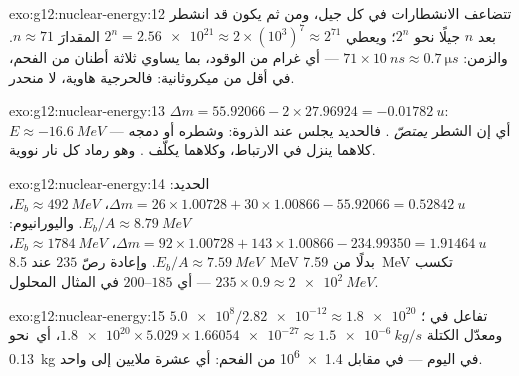 \begin{solution}{exo:g12:nuclear-energy:12}
تتضاعف الانشطارات في كل جيل، ومن ثم يكون قد انشطر بعد $n$ جيلًا نحو $2^n$؛
ويعطي $2^{n} = \num{2.56e21} \approx 2 \times (10^{3})^{7}
\approx 2^{71}$ المقدارَ $n \approx 71$. والزمن: $71 \times \qty{10}{ns}
\approx \qty{0.7}{\micro s}$ --- أي غرام من الوقود، بما يساوي ثلاثة أطنان من الفحم،
في أقل من ميكروثانية: فالحرجية هاوية، لا منحدر.
\end{solution}

\begin{solution}{exo:g12:nuclear-energy:13}
$\Delta m = 55.92066 - 2 \times 27.96924 = \qty{-0.01782}{u}$:
$E \approx \qty{-16.6}{MeV}$ --- أي إن الشطر \emph{يمتصّ} .
فالحديد يجلس عند الذروة: وشطره أو دمجه كلاهما ينزل في
الارتباط، وكلاهما يكلّف . وهو رماد كل نار نووية.
\end{solution}

\begin{solution}{exo:g12:nuclear-energy:14}
الحديد: $\Delta m = 26 \times 1.00728 + 30 \times 1.00866 - 55.92066 =
\qty{0.52842}{u}$، $E_b \approx \qty{492}{MeV}$، $E_b/A \approx
\qty{8.79}{MeV}$. واليورانيوم: $\Delta m = 92 \times 1.00728 + 143 \times
1.00866 - 234.99350 = \qty{1.91464}{u}$، $E_b \approx \qty{1784}{MeV}$،
$E_b/A \approx \qty{7.59}{MeV}$. وإعادة رصّ $235$  عند
\qty{8.5}{MeV} بدلًا من \qty{7.59}{MeV} تكسب $235 \times 0.9
\approx \qty{2e2}{MeV}$ --- أي $185$--$200$ في المثال المحلول.
\end{solution}

\begin{solution}{exo:g12:nuclear-energy:15}
$\num{5.0e8}/\num{2.82e-12} \approx \num{1.8e20}$ تفاعل في
؛ ومعدّل الكتلة $\num{1.8e20} \times 5.029 \times \num{1.66054e-27}
\approx \qty{1.5e-6}{kg/s}$، أي\ نحو \qty{0.13}{kg} في اليوم ---
في مقابل \num{1.4e6}  من الفحم: أي عشرة ملايين إلى واحد.
\end{solution}

